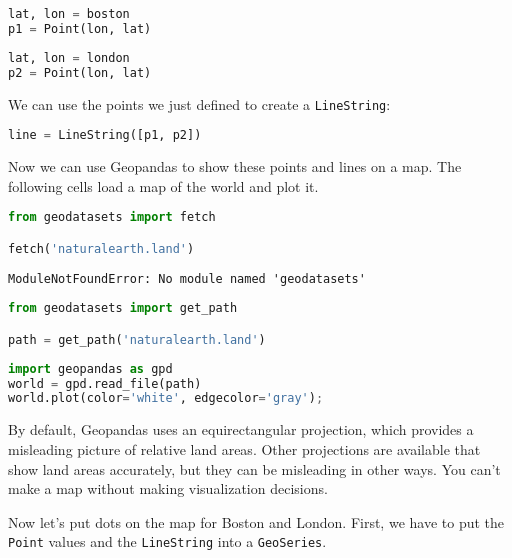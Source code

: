 \begin{lstlisting}[language=Python,style=source]
lat, lon = boston
p1 = Point(lon, lat)
\end{lstlisting}

\begin{lstlisting}[language=Python,style=source]
lat, lon = london
p2 = Point(lon, lat)
\end{lstlisting}

We can use the points we just defined to create a
\passthrough{\lstinline!LineString!}:

\begin{lstlisting}[language=Python,style=source]
line = LineString([p1, p2])
\end{lstlisting}

Now we can use Geopandas to show these points and lines on a map. The
following cells load a map of the world and plot it.

\begin{lstlisting}[language=Python,style=source]
from geodatasets import fetch

fetch('naturalearth.land')
\end{lstlisting}

\begin{lstlisting}[style=output]
ModuleNotFoundError: No module named 'geodatasets'
\end{lstlisting}

\begin{lstlisting}[language=Python,style=source]
from geodatasets import get_path

path = get_path('naturalearth.land')
\end{lstlisting}

\begin{lstlisting}[language=Python,style=source]
import geopandas as gpd
world = gpd.read_file(path)
world.plot(color='white', edgecolor='gray');
\end{lstlisting}

By default, Geopandas uses an equirectangular projection, which provides
a misleading picture of relative land areas. Other projections are
available that show land areas accurately, but they can be misleading in
other ways. You can't make a map without making visualization decisions.

Now let's put dots on the map for Boston and London. First, we have to
put the \passthrough{\lstinline!Point!} values and the
\passthrough{\lstinline!LineString!} into a
\passthrough{\lstinline!GeoSeries!}.

